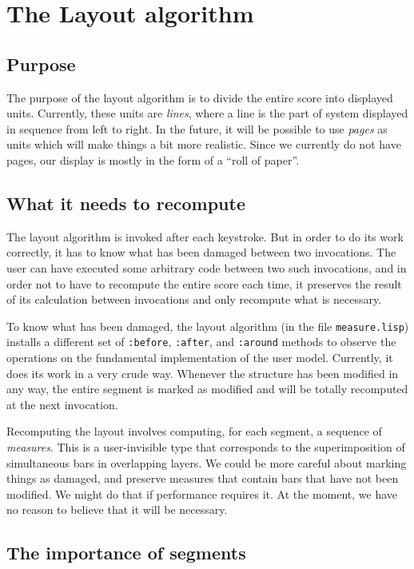 \documentclass[11pt]{book}
\begin{document}
\chapter{The Layout algorithm}

\section{Purpose}

The purpose of the layout algorithm is to divide the entire score into
displayed units.  Currently, these units are \emph{lines}, where a
line is the part of system displayed in sequence from left to right.
In the future, it will be possible to use \emph{pages} as units which
will make things a bit more realistic.  Since we currently do not have
pages, our display is mostly in the form of a ``roll of paper''.

\section{What it needs to recompute}

The layout algorithm is invoked after each keystroke.  But in order to
do its work correctly, it has to know what has been damaged between
two invocations.  The user can have executed some arbitrary code
between two such invocations, and in order not to have to recompute
the entire score each time, it preserves the result of its calculation
between invocations and only recompute what is necessary. 

To know what has been damaged, the layout algorithm (in the file
\texttt{measure.lisp}) installs a different set of \texttt{:before},
\texttt{:after}, and \texttt{:around} methods to observe the
operations on the fundamental implementation of the user model.
Currently, it does its work in a very crude way.  Whenever the
structure has been modified in any way, the entire segment is marked
as modified and will be totally recomputed at the next invocation. 

Recomputing the layout involves computing, for each segment, a
sequence of \emph{measures}.  This is a user-invisible
type that corresponds to the superimposition of simultaneous bars in
overlapping layers.  We could be more careful about marking things as
damaged, and preserve measures that contain bars that have not been
modified.  We might do that if performance requires it.  At the
moment, we have no reason to believe that it will be necessary.  

\section{The importance of segments}
\end{document}
